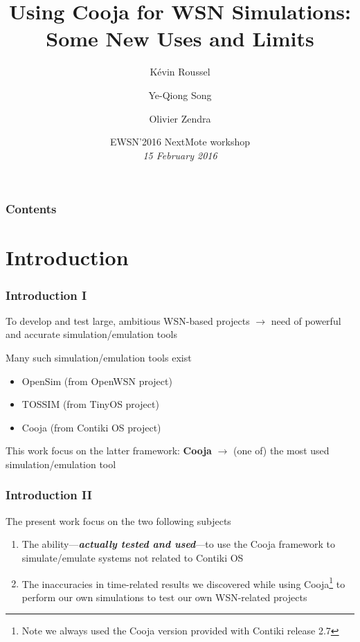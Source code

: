 \documentclass[10pt,c]{beamer}
\title{Using Cooja for WSN Simulations: Some New Uses and Limits}
\author{Kévin Roussel \and Ye-Qiong Song \and Olivier Zendra}
\institute{INRIA Nancy Grand-Est~---
           LORIA UMR~7503~--- Université de Lorraine}
\date{EWSN'2016 NextMote workshop\\
      \textit{15 February 2016}}
\renewcommand{\emph}[1]{\textbf{\textit{#1}}}
\newcommand{\nom}[1]{\textbf{#1}}
\begin{document}
\begin{frame}
\titlepage
\end{frame}


\begin{frame}
\frametitle{Contents}
\tableofcontents
\end{frame}


\section{Introduction}

\begin{frame}
\frametitle{Introduction I}
\begin{block}{To develop and test large, ambitious WSN-based projects}
$\rightarrow$ need of powerful and accurate simulation/emulation tools
\end{block}
\begin{block}{Many such simulation/emulation tools exist}
\begin{itemize}
\item OpenSim (from OpenWSN project)
\item TOSSIM (from TinyOS project)
\item Cooja (from Contiki OS project)
\end{itemize}
\end{block}
\begin{exampleblock}{This work focus on the latter framework: \nom{Cooja}}
$\rightarrow$ (one of) the most used simulation/emulation tool
\end{exampleblock}
\end{frame}

\begin{frame}
\frametitle{Introduction II}
\begin{block}{The present work focus on the two following subjects}
\begin{enumerate}
\item The ability---\emph{actually tested and used}---to use the Cooja
framework to simulate/emulate systems not related to Contiki OS
\item The inaccuracies in time-related results we discovered while using
Cooja\footnote{Note we always used the Cooja version provided with
Contiki release 2.7} to perform our own simulations to test our own
WSN-related projects
\end{enumerate}
\end{block}
\end{frame}
\end{document}
